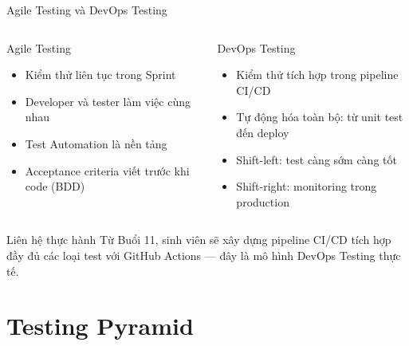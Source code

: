 \documentclass[aspectratio=169,12pt]{beamer}
\begin{document}
\begin{frame}{Agile Testing và DevOps Testing}
  \begin{columns}
    \begin{block}{Agile Testing}
      \begin{itemize}
        \item Kiểm thử liên tục trong Sprint
        \item Developer và tester làm việc cùng nhau
        \item Test Automation là nền tảng
        \item Acceptance criteria viết trước khi code (BDD)
      \end{itemize}
    \end{block}

    \begin{block}{DevOps Testing}
      \begin{itemize}
        \item Kiểm thử tích hợp trong pipeline CI/CD
        \item Tự động hóa toàn bộ: từ unit test đến deploy
        \item Shift-left: test càng sớm càng tốt
        \item Shift-right: monitoring trong production
      \end{itemize}
    \end{block}
  \end{columns}

  \vspace{0.5em}
  \begin{alertblock}{Liên hệ thực hành}
    Từ Buổi 11, sinh viên sẽ xây dựng pipeline CI/CD tích hợp đầy đủ
    các loại test với GitHub Actions --- đây là mô hình DevOps Testing thực tế.
  \end{alertblock}
\end{frame}

\section{Testing Pyramid}
\end{document}
